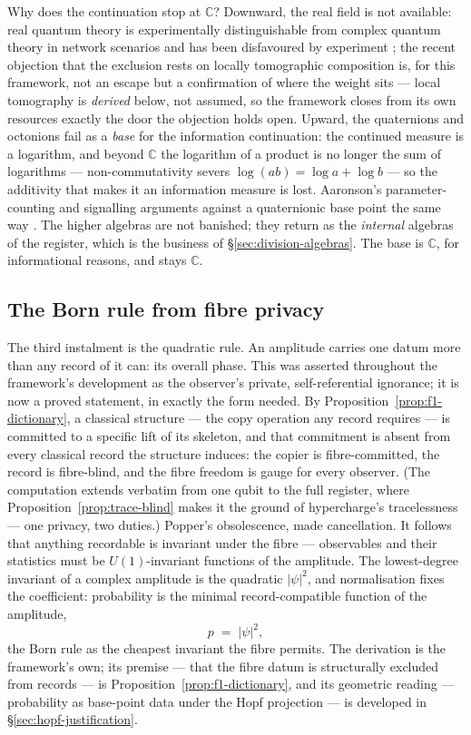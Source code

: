 Why does the continuation stop at $\mathbb{C}$? Downward, the real field is not available: real
quantum theory is experimentally distinguishable from complex quantum theory in network scenarios
and has been disfavoured by experiment
\autocite{renou2021real,chen2022ruling,wu2022refutation}; the recent objection that the exclusion
rests on locally tomographic composition \autocite{hoffreumonwoods2026real} is, for this framework,
not an escape but a confirmation of where the weight sits --- local tomography is \emph{derived}
below, not assumed, so the framework closes from its own resources exactly the door the objection
holds open. Upward, the quaternions and octonions fail as a \emph{base} for the information
continuation: the continued measure is a logarithm, and beyond $\mathbb{C}$ the logarithm of a
product is no longer the sum of logarithms --- non-commutativity severs
$\log(ab) = \log a + \log b$ --- so the additivity that makes it an information measure is lost.
Aaronson's parameter-counting and signalling arguments against a quaternionic base point the same
way \autocite{Aaronson2004h}. The higher algebras are not banished; they return as the
\emph{internal} algebras of the register, which is the business of \S\ref{sec:division-algebras}.
The base is $\mathbb{C}$, for informational reasons, and stays $\mathbb{C}$.

\subsection{The Born rule from fibre privacy}\label{sec:born-rule}

The third instalment is the quadratic rule. An amplitude carries one datum more than any record of
it can: its overall phase. This was asserted throughout the framework's development as the
observer's private, self-referential ignorance; it is now a proved statement, in exactly the form
needed. By Proposition~\ref{prop:f1-dictionary}, a classical structure --- the copy operation any
record requires --- is committed to a specific lift of its skeleton, and that commitment is absent
from every classical record the structure induces: the copier is fibre-committed, the record is
fibre-blind, and the fibre freedom is gauge for every observer. (The computation extends verbatim
from one qubit to the full register, where Proposition~\ref{prop:trace-blind} makes it the ground
of hypercharge's tracelessness --- one privacy, two duties.) Popper's obsolescence, made
cancellation. It follows that anything recordable is invariant under the fibre --- observables and
their statistics must be $U(1)$-invariant functions of the amplitude. The lowest-degree invariant
of a complex amplitude is the quadratic $|\psi|^{2}$, and normalisation fixes the coefficient:
probability is the minimal record-compatible function of the amplitude,
\[
p \;=\; |\psi|^{2},
\]
the Born rule as the cheapest invariant the fibre permits. The derivation is the framework's own;
its premise --- that the fibre datum is structurally excluded from records --- is
Proposition~\ref{prop:f1-dictionary}, and its geometric reading --- probability as base-point data
under the Hopf projection --- is developed in \S\ref{sec:hopf-justification}.

